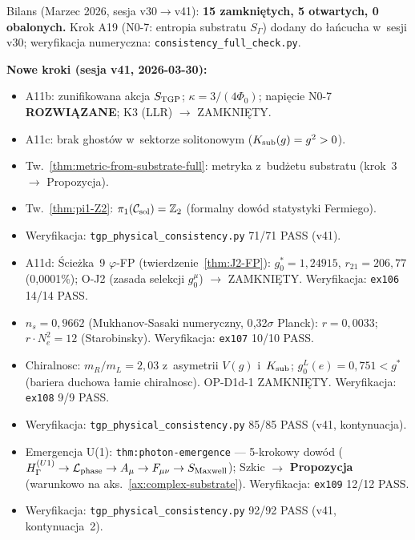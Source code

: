 Bilans (Marzec 2026, sesja v30$\to$v41):
\textbf{15 zamkni\k{e}tych, 5 otwartych, 0 obalonych.}
Krok A19 (N0-7: entropia substratu $S_\Gamma$) dodany
do \l{}a\'ncucha w~sesji v30; weryfikacja numeryczna:
\texttt{consistency\_full\_check.py}.

\smallskip\noindent\textbf{Nowe kroki (sesja v41, 2026-03-30):}
\begin{itemize}[nosep]
  \item A11b: zunifikowana akcja $S_{\rm TGP}$;
        $\kappa = 3/(4\Phi_0)$;
        napi\k{e}cie N0-7 \textbf{ROZWI\k{A}ZANE};
        K3 (LLR) $\to$ ZAMKNI\k{E}TY.
  \item A11c: brak ghost\'ow w~sektorze solitonowym
        ($K_{\rm sub}(g) = g^2 > 0$).
  \item Tw.~\ref{thm:metric-from-substrate-full}: metryka
        z~bud\.zetu substratu (krok~3 $\to$ Propozycja).
  \item Tw.~\ref{thm:pi1-Z2}: $\pi_1(\mathcal{C}_{\rm sol}) = \mathbb{Z}_2$
        (formalny dow\'od statystyki Fermiego).
  \item Weryfikacja: \texttt{tgp\_physical\_consistency.py}
        71/71 PASS (v41).
  \item A11d: \'Scie\.zka~9 $\varphi$-FP (twierdzenie~\ref{thm:J2-FP}):
        $g_0^* = 1{,}24915$, $r_{21} = 206{,}77$ (0{,}0001\%);
        O-J2 (zasada selekcji $g_0^\mu$) $\to$ ZAMKNI\k{E}TY.
        Weryfikacja: \texttt{ex106} 14/14 PASS.
  \item $n_s = 0{,}9662$ (Mukhanov-Sasaki numeryczny, 0{,}32$\sigma$ Planck):
        $r = 0{,}0033$; $r \cdot N_e^2 = 12$ (Starobinsky).
        Weryfikacja: \texttt{ex107} 10/10 PASS.
  \item Chiralnosc: $m_R/m_L = 2{,}03$ z~asymetrii $V(g)$ i~$K_{\rm sub}$;
        $g_0^L(e) = 0{,}751 < g^*$ (bariera duchowa {\l}amie chiralnosc).
        OP-D1d-1 ZAMKNI\k{E}TY. Weryfikacja: \texttt{ex108} 9/9 PASS.
  \item Weryfikacja: \texttt{tgp\_physical\_consistency.py}
        85/85 PASS (v41, kontynuacja).
  \item Emergencja U(1): \texttt{thm:photon-emergence} ---
        5-krokowy dow\'od ($H_\Gamma^{(U1)} \to \mathcal{L}_{\rm phase}
        \to A_\mu \to F_{\mu\nu} \to S_{\rm Maxwell}$);
        Szkic $\to$ \textbf{Propozycja} (warunkowo na aks.~\ref{ax:complex-substrate}).
        Weryfikacja: \texttt{ex109} 12/12 PASS.
  \item Weryfikacja: \texttt{tgp\_physical\_consistency.py}
        92/92 PASS (v41, kontynuacja~2).

\end{itemize}
